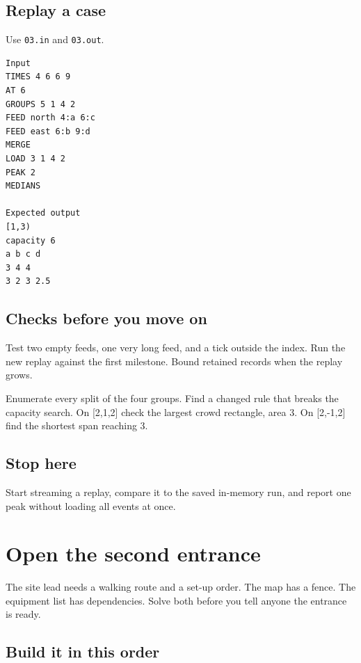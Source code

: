 \documentclass[11pt,letterpaper]{article}
\begin{document}
\subsection*{Replay a case}

Use \texttt{03.in} and \texttt{03.out}.

\begin{samepage}
\small
\begin{verbatim}
Input
TIMES 4 6 6 9
AT 6
GROUPS 5 1 4 2
FEED north 4:a 6:c
FEED east 6:b 9:d
MERGE
LOAD 3 1 4 2
PEAK 2
MEDIANS

Expected output
[1,3)
capacity 6
a b c d
3 4 4
3 2 3 2.5
\end{verbatim}
\end{samepage}

\subsection*{Checks before you move on}

Test two empty feeds, one very long feed, and a tick outside the index. Run the new replay against the first milestone. Bound retained records when the replay grows.

Enumerate every split of the four groups. Find a changed rule that breaks the capacity search. On [2,1,2] check the largest crowd rectangle, area 3. On [2,-1,2] find the shortest span reaching 3.

\subsection*{Stop here}

Start streaming a replay, compare it to the saved in-memory run, and report one peak without loading all events at once.

\clearpage

\section{Open the second entrance}\label{festival:04}

The site lead needs a walking route and a set-up order. The map has a fence. The equipment list has dependencies. Solve both before you tell anyone the entrance is ready.

\subsection*{Build it in this order}
\end{document}
